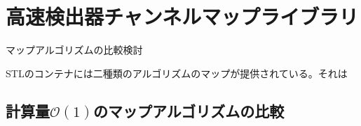 \documentclass[../main.tex]{subfiles}
\begin{document}
\clearpage
\appendix
\section{高速検出器チャンネルマップライブラリ}
\label{sec:appendix}
マップアルゴリズムの比較検討

STLのコンテナには二種類のアルゴリズムのマップが提供されている。それは
\subsection{計算量$\mathcal{O}(1)$のマップアルゴリズムの比較}
\subsubsection{}
\end{document}
